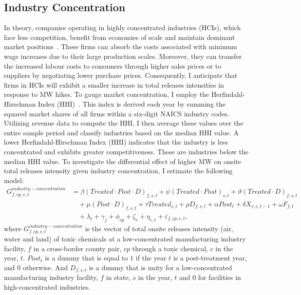 \documentclass[12pt, english]{article}
\begin{document}
    \subsection{Industry Concentration}\label{subsec:industry-concentration}
    In theory, companies operating in highly concentrated industries (HCIs), which face less competition, benefit from economies of scale and maintain dominant market positions~\parencite{baumol1982contestable}. These firms can absorb the costs associated with minimum wage increases due to their large production scales. Moreover, they can transfer the increased labour costs to consumers through higher sales prices or to suppliers by negotiating lower purchase prices. Consequently, I anticipate that firms in HCIs will exhibit a smaller increase in total releases intensities in response to MW hikes. To gauge market concentration, I employ the Herfindahl-Hirschman Index (HHI)~\parencite{zhang2023unintended, weinstock1982using}. This index is derived each year by summing the squared market shares of all firms within a six-digit NAICS industry codes. Utilizing revenue data to compute the HHI, I then average these values over the entire sample period and classify industries based on the median HHI value. A lower Herfindahl-Hirschman Index (HHI) indicates that the industry is less concentrated and exhibits greater competitiveness. These are industries below the median HHI value. To investigate the differential effect of higher MW on onsite total releases intensity given industry concentration, I estimate the following model:
    \begin{align}
        G_{f,cp,c,t}^{industry-concentration} &= \beta (Treated \cdot Post \cdot D)_{f,s,t} + \psi (Treated \cdot Post)_{s,t} + \vartheta (Treated \cdot D)_{f,s,t} \nonumber \\
        &\quad + \mu (Post \cdot D)_{f,s,t} + \tau Treated_{s,t} + \rho D_{f,s,t} + \alpha Post_{t} + \delta X_{v,c,t-1} + \omega F_{f,t} \nonumber \\
        &\quad + \lambda_{t} + \gamma_{f} + \phi_{cp} + \zeta_{c} + \eta_{c,t} + \varepsilon_{f,cp,c,t},\label{eq:heterogeneous-onsite-releases-intensity-lcis}
    \end{align}
    where $G_{f,cp,c,t}^{industry-concentration}$ is the vector of total onsite releases intensity (air, water and land) of toxic chemicals at a low-concentrated manufacturing industry facility, $f$ in a cross-border county pair, $cp$ through a toxic chemical, $c$ in the year, $t$. $Post_{t}$ is a dummy that is equal to $1$ if the year $t$ is a post-treatment year, and $0$ otherwise. And $D_{f,s,t}$ is a dummy that is unity for a low-concentrated manufacturing industry facility, $f$ in state, $s$ in the year, $t$ and $0$ for facilities in high-concentrated industries.
    
\end{document}
